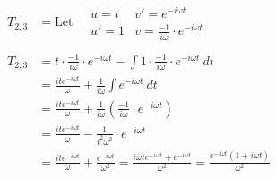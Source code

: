 \documentclass[preview]{standalone}
\begin{document}
\begin{align*}
T_{2,3}&= \textrm{Let} \quad \begin{array}{rl}u=t & v'=e^{-i\omega t} \\ u'=1 & v=\frac{-1}{i\omega}\cdot e^{-i\omega t} \end{array} \\ \\  T_{2,3}&=t\cdot \frac{-1}{i\omega}\cdot e^{-i\omega t}-\int 1\cdot \frac{-1}{i\omega}\cdot e^{-i\omega t} \ dt \\ &=\frac{ite^{-i\omega t}}{\omega}+\frac{1}{i\omega}\int e^{-i\omega t} \ dt \\ &=\frac{ite^{-i\omega t}}{\omega}+\frac{1}{i\omega}\left(\frac{-1}{i\omega}\cdot e^{-i\omega t}\right) \\ &=\frac{ite^{-i\omega t}}{\omega}-\frac{1}{i^{2}\omega^{2}}\cdot e^{-i\omega t} \\ &=\frac{ite^{-i\omega t}}{\omega}+\frac{e^{-i\omega t}}{\omega^{2}} =\frac{i\omega t e^{-i\omega t}+e^{-i\omega t}}{\omega^{2}} = \frac{e^{-i\omega t}(1+i\omega t)}{\omega^{2}}
\end{align*}
\end{document}
